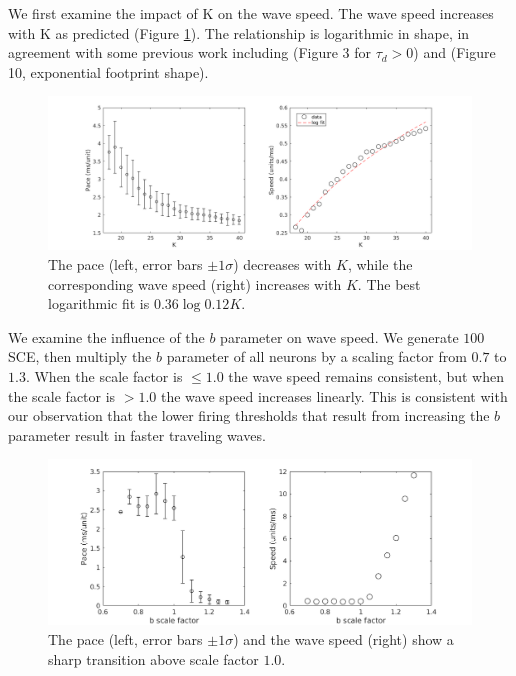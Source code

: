 \documentclass[12pt]{article}
\begin{document}
\color{red} We first examine the impact of K on the wave speed.
The wave speed increases with K as predicted (Figure \ref{fig:delay_k}).
The relationship is logarithmic in shape, in agreement with some previous work including \parencite{Golomb1999} (Figure 3 for $\tau_d>0$) and \parencite{Golomb1996}(Figure 10, exponential footprint shape).

\color{black}
\begin{figure}[!htb]
 \caption{The pace (left, error bars $\pm 1 \sigma$) decreases with $K$, while the corresponding wave speed (right) increases with $K$. 
          \color{red}The best logarithmic fit is $0.36\log{0.12K}$\color{black}.}
 \label{fig:delay_k}
 \centering
   \includegraphics[width=\textwidth]{fig/WaveSpeed_K}
\end{figure}

\color{red}
We examine the influence of the $b$ parameter on wave speed.
We generate $100$ SCE, then multiply the $b$ parameter of all neurons by a scaling factor from $0.7$ to $1.3$.
When the scale factor is $\leq 1.0$ the wave speed remains consistent, but when the scale factor is $>1.0$ the wave speed increases linearly.
This is consistent with our observation that the lower firing thresholds that result from increasing the $b$ parameter result in faster traveling waves.
\color{black}
\begin{figure}[!htb]
 \caption{The pace (left, error bars $\pm 1 \sigma$) and the wave speed (right) show a sharp transition above scale factor $1.0$. }
 \label{fig:delay_b}
 \centering
   \includegraphics[width=\textwidth]{fig/WaveSpeed_B}
\end{figure}
\end{document}
